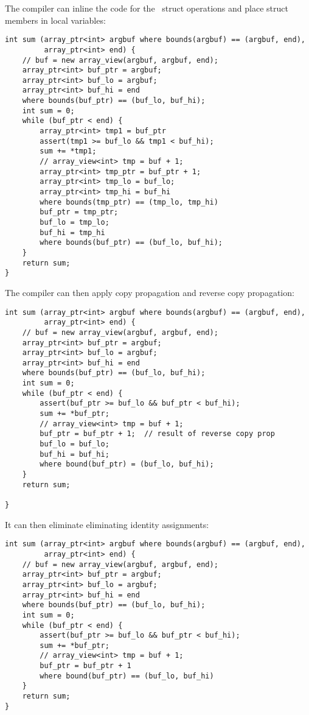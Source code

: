 The compiler can inline the code for the \arrayview\ struct operations
and place struct members in local variables:
\begin{verbatim}
int sum (array_ptr<int> argbuf where bounds(argbuf) == (argbuf, end),
         array_ptr<int> end) {
    // buf = new array_view(argbuf, argbuf, end);
    array_ptr<int> buf_ptr = argbuf; 
    array_ptr<int> buf_lo = argbuf;
    array_ptr<int> buf_hi = end
    where bounds(buf_ptr) == (buf_lo, buf_hi);
    int sum = 0;
    while (buf_ptr < end) {
        array_ptr<int> tmp1 = buf_ptr
        assert(tmp1 >= buf_lo && tmp1 < buf_hi);
        sum += *tmp1;
        // array_view<int> tmp = buf + 1;
        array_ptr<int> tmp_ptr = buf_ptr + 1;
        array_ptr<int> tmp_lo = buf_lo;
        array_ptr<int> tmp_hi = buf_hi
        where bounds(tmp_ptr) == (tmp_lo, tmp_hi)
        buf_ptr = tmp_ptr;
        buf_lo = tmp_lo;
        buf_hi = tmp_hi
        where bounds(buf_ptr) == (buf_lo, buf_hi);
    }
    return sum;
}
\end{verbatim}

The compiler can then apply copy propagation and reverse copy
propagation:

\begin{verbatim}
int sum (array_ptr<int> argbuf where bounds(argbuf) == (argbuf, end), 
         array_ptr<int> end) {
    // buf = new array_view(argbuf, argbuf, end);
    array_ptr<int> buf_ptr = argbuf; 
    array_ptr<int> buf_lo = argbuf;
    array_ptr<int> buf_hi = end
    where bounds(buf_ptr) == (buf_lo, buf_hi);
    int sum = 0;
    while (buf_ptr < end) {
        assert(buf_ptr >= buf_lo && buf_ptr < buf_hi);
        sum += *buf_ptr;
        // array_view<int> tmp = buf + 1;
        buf_ptr = buf_ptr + 1;  // result of reverse copy prop
        buf_lo = buf_lo;
        buf_hi = buf_hi;
        where bound(buf_ptr) = (buf_lo, buf_hi);
    }
    return sum;

}
\end{verbatim}

It can then eliminate eliminating identity assignments:

\begin{verbatim}
int sum (array_ptr<int> argbuf where bounds(argbuf) == (argbuf, end), 
         array_ptr<int> end) {
    // buf = new array_view(argbuf, argbuf, end);
    array_ptr<int> buf_ptr = argbuf; 
    array_ptr<int> buf_lo = argbuf;
    array_ptr<int> buf_hi = end
    where bounds(buf_ptr) == (buf_lo, buf_hi);
    int sum = 0;
    while (buf_ptr < end) {
        assert(buf_ptr >= buf_lo && buf_ptr < buf_hi);
        sum += *buf_ptr;
        // array_view<int> tmp = buf + 1;
        buf_ptr = buf_ptr + 1
        where bound(buf_ptr) == (buf_lo, buf_hi)
    }
    return sum;
}
\end{verbatim}

